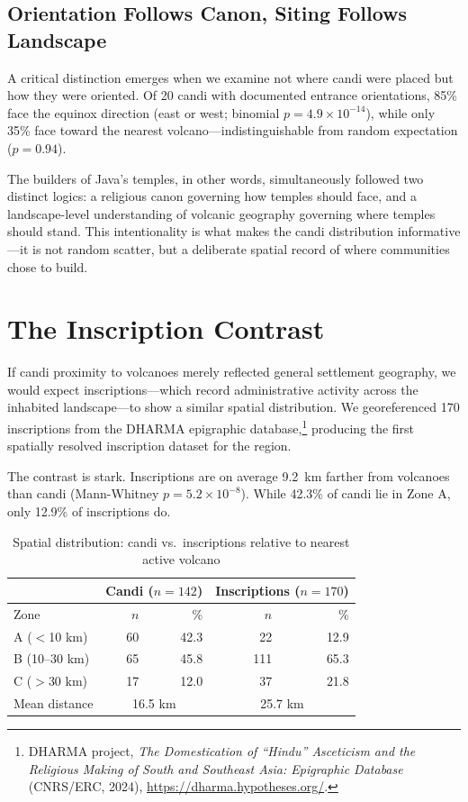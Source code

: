 \documentclass[12pt,a4paper]{article}
\begin{document}
\subsection{Orientation Follows Canon, Siting Follows Landscape}

A critical distinction emerges when we examine not where candi were placed but how they were oriented. Of 20 candi with documented entrance orientations, 85\% face the equinox direction (east or west; binomial $p = 4.9 \times 10^{-14}$), while only 35\% face toward the nearest volcano---indistinguishable from random expectation ($p = 0.94$).

The builders of Java's temples, in other words, simultaneously followed two distinct logics: a religious canon governing how temples should face, and a landscape-level understanding of volcanic geography governing where temples should stand. This intentionality is what makes the candi distribution informative---it is not random scatter, but a deliberate spatial record of where communities chose to build.

\section{The Inscription Contrast}

If candi proximity to volcanoes merely reflected general settlement geography, we would expect inscriptions---which record administrative activity across the inhabited landscape---to show a similar spatial distribution. We georeferenced 170 inscriptions from the DHARMA epigraphic database,\footnote{DHARMA project, \emph{The Domestication of ``Hindu'' Asceticism and the Religious Making of South and Southeast Asia: Epigraphic Database} (CNRS/ERC, 2024), \url{https://dharma.hypotheses.org/}.} producing the first spatially resolved inscription dataset for the region.

The contrast is stark. Inscriptions are on average 9.2~km farther from volcanoes than candi (Mann-Whitney $p = 5.2 \times 10^{-8}$). While 42.3\% of candi lie in Zone A, only 12.9\% of inscriptions do.

\begin{table}[h]
\centering
\caption{Spatial distribution: candi vs.\ inscriptions relative to nearest active volcano}
\begin{tabular}{lrrrr}
\toprule
 & \multicolumn{2}{c}{Candi ($n=142$)} & \multicolumn{2}{c}{Inscriptions ($n=170$)} \\
\midrule
Zone & $n$ & \% & $n$ & \% \\
\midrule
A ($<$10 km) & 60 & 42.3 & 22 & 12.9 \\
B (10--30 km) & 65 & 45.8 & 111 & 65.3 \\
C ($>$30 km) & 17 & 12.0 & 37 & 21.8 \\
\midrule
Mean distance & \multicolumn{2}{c}{16.5 km} & \multicolumn{2}{c}{25.7 km} \\
\bottomrule
\end{tabular}
\label{tab:inscr_candi}
\end{table}
\end{document}
